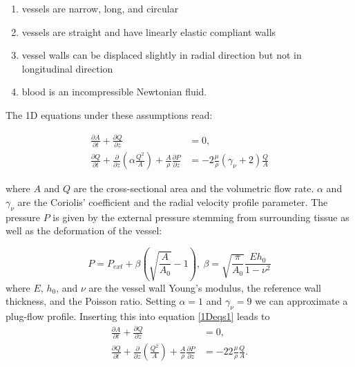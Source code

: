 \documentclass[a4paper, oneside]{discothesis}
\begin{document}
\begin{enumerate}
	\item vessels are narrow, long, and circular
	\item vessels are straight and have linearly elastic compliant walls
	\item vessel walls can be displaced slightly in radial direction but not in longitudinal direction
	\item blood is an incompressible Newtonian fluid.
\end{enumerate}

The 1D equations under these assumptions read:

\begin{equation}
		\begin{aligned} 
			\frac{\partial A}{\partial t} + \frac{\partial Q}{\partial z} &= 0, \\ 
			\frac{\partial Q}{\partial t} + \frac{\partial}{\partial z}\left(\alpha \frac{Q^2}{A} \right) + \frac{A}{\rho} \frac{\partial P}{\partial z} &= -2 \frac{\mu}{\rho} \left( \gamma_\nu + 2 \right) \frac{Q}{A}
		\end{aligned} \label{1Deqs1}
\end{equation}

where $A$ and $Q$ are the cross-sectional area and the volumetric flow rate.
$\alpha$ and $\gamma_\nu$ are the Coriolis' coefficient and the radial velocity profile parameter.
The pressure $P$ is given by the external pressure stemming from surrounding tissue as well as the deformation of the vessel:

\begin{equation}
	P = P_{ext} + \beta \left( \sqrt{\frac{A}{A_0}} - 1 \right), \  \beta = \sqrt{\frac{\pi}{A_0}} \frac{E h_0}{1-\nu^2}
\end{equation}
 where $E$, $h_0$, and $\nu$ are the vessel wall Young's modulus, the reference wall thickness, and the Poisson ratio.
Setting $\alpha = 1$ and $\gamma_\nu = 9$ we can approximate a plug-flow profile.
Inserting this into equation \ref{1Deqs1} leads to 
\begin{equation}
		\begin{aligned} 
			\frac{\partial A}{\partial t} + \frac{\partial Q}{\partial z} &= 0, \\ 
			\frac{\partial Q}{\partial t} + \frac{\partial}{\partial z}\left(\frac{Q^2}{A} \right) + \frac{A}{\rho} \frac{\partial P}{\partial z} &= -22 \frac{\mu}{\rho} \frac{Q}{A}.
		\end{aligned} \label{1Deqs2}
\end{equation}
\end{document}
